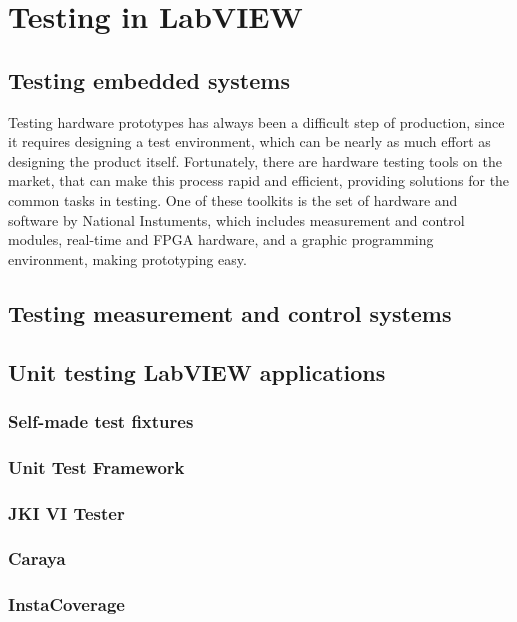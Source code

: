 \chapter{Testing in LabVIEW}


\section{Testing embedded systems}
Testing hardware prototypes has always been a difficult step of production, since it requires designing a test environment, which can be nearly as much effort as designing the product itself. Fortunately, there are hardware testing tools on the market, that can make this process rapid and efficient, providing solutions for the common tasks in testing. One of these toolkits is the set of hardware and software by National Instuments, which includes measurement and control modules, real-time and FPGA hardware, and a graphic programming environment, making prototyping easy.
\section{Testing measurement and control systems}
\section{Unit testing LabVIEW applications}
\subsection{Self-made test fixtures}
\subsection{Unit Test Framework}
\subsection{JKI VI Tester}
\subsection{Caraya}
\subsection{InstaCoverage}